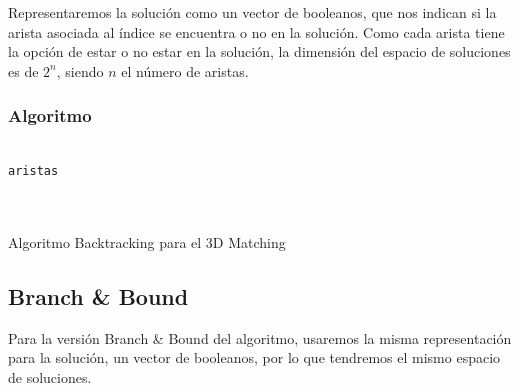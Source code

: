 \documentclass[a4paper, 11pt]{article} %
\let\emptyset\varnothing
\begin{document}
  Representaremos la solución como un vector de booleanos, que nos indican si la arista asociada al índice se encuentra o no en la solución. Como cada arista tiene la opción de estar o no estar en la solución, la dimensión del espacio de soluciones es de $2^n$, siendo $n$ el número de aristas. 
  \subsubsection{Algoritmo}
        \begin{algorithm}[H]
        	\begin{algorithmic}[1]
    		\REQUIRE \ \\
          	\texttt{aristas} \\
       	\\\
       	
       	\WHILE{\texttt{posibles\_particiones}$\neq \emptyset$}
  		    \ENDIF
  		  \ELSE
  	        
  	        \ENDIF
  	      \ENDIF
   		\ENDWHILE
        	\end{algorithmic}
            \caption{Algoritmo Backtracking para el 3D Matching}
            \label{Back-3DMatch}
        \end{algorithm}
  
  
  \subsection{Branch \& Bound}
  
    Para la versión Branch \& Bound del algoritmo, usaremos la misma representación para la solución, un vector de booleanos, por lo que tendremos el mismo espacio de soluciones.
    
\end{document}
